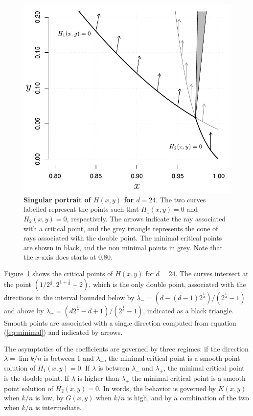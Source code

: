 \documentclass{article}
\begin{document}
\begin{figure}[h]
\centering
\includegraphics[scale=0.55]{Fig5.pdf}
\caption{\textbf{Singular portrait of $H(x,y)$ for $d=24$}. The two curves
labelled represent the points such that $H_1(x,y) = 0$ and $H_2(x,y) = 0$,
respectively. The arrows indicate the ray associated with a critical
point, and the grey triangle represents the cone of rays associated with
the double point. The minimal critical points are shown in black, and the
non minimal points in grey. Note that the $x$-axis does starts at 0.80.}
\label{fig:singular}
\end{figure}

Figure~\ref{fig:singular} shows the critical points of $H(x,y)$ for
$d=24$. The curves intersect at the point $\left( 1/2^{\frac{1}{d}},
2^{1+\frac{1}{d}}-2 \right)$, which is the only double point, associated
with the directions in the interval bounded below by $\lambda_- =
(d-(d-1)2^{\frac{1}{d}}) / (2^{\frac{1}{d}}-1)$ and above by $\lambda_+ =
(d2^{\frac{1}{d}}-d+1) / (2^{\frac{1}{d}}-1)$, indicated as a black
triangle.  Smooth points are associated with a single direction computed
from equation (\ref{eq:minimal}) and indicated by arrows.

The asymptotics of the coefficients are governed by three regimes: if the
direction $\lambda = \lim k/n$ is between $1$ and $\lambda_-$, the minimal
critical point is a smooth point solution of $H_1(x,y) = 0$. If $\lambda$
is between $\lambda_-$ and $\lambda_+$, the minimal critical point is the
double point. If $\lambda$ is higher than $\lambda_+$ the minimal critical
point is a smooth point solution of $H_2(x,y) = 0$. In words, the behavior
is governed by $K(x,y)$ when $k/n$ is low, by $G(x,y)$ when $k/n$ is high,
and by a combination of the two when $k/n$ is intermediate.
\end{document}
